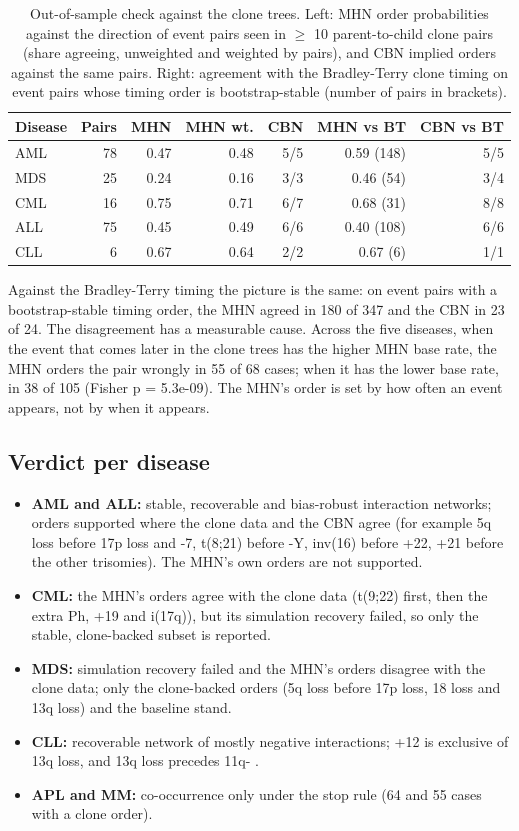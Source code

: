 \documentclass[conference]{IEEEtran}
\begin{document}
\begin{table}[!t]
\centering
\caption{Out-of-sample check against the clone trees. Left: MHN order probabilities against the direction of event pairs seen in $\geq$ 10 parent-to-child clone pairs (share agreeing, unweighted and weighted by pairs), and CBN implied orders against the same pairs. Right: agreement with the Bradley-Terry clone timing on event pairs whose timing order is bootstrap-stable (number of pairs in brackets).}
\label{tab:clone}
\footnotesize
\setlength{\tabcolsep}{3pt}
\begin{tabular}{lrrrrrr}
\toprule
\textbf{Disease} & \textbf{Pairs} & \textbf{MHN} & \textbf{MHN wt.} & \textbf{CBN} & \textbf{MHN vs BT} & \textbf{CBN vs BT} \\
\midrule
AML & 78 & 0.47 & 0.48 & 5/5 & 0.59 (148) & 5/5 \\
MDS & 25 & 0.24 & 0.16 & 3/3 & 0.46 (54) & 3/4 \\
CML & 16 & 0.75 & 0.71 & 6/7 & 0.68 (31) & 8/8 \\
ALL & 75 & 0.45 & 0.49 & 6/6 & 0.40 (108) & 6/6 \\
CLL & 6 & 0.67 & 0.64 & 2/2 & 0.67 (6) & 1/1 \\
\bottomrule
\end{tabular}
\end{table}
Against the Bradley-Terry timing the picture is the same: on event pairs with a bootstrap-stable timing order, the MHN agreed in 180 of 347 and the CBN in 23 of 24. The disagreement has a measurable cause. Across the five diseases, when the event that comes later in the clone trees has the higher MHN base rate, the MHN orders the pair wrongly in 55 of 68 cases; when it has the lower base rate, in 38 of 105 (Fisher p = 5.3e-09). The MHN's order is set by how often an event appears, not by when it appears.

\subsection{Verdict per disease}
\begin{itemize}
\item \textbf{AML and ALL:} stable, recoverable and bias-robust interaction networks; orders supported where the clone data and the CBN agree (for example 5q loss before 17p loss and -7, t(8;21) before -Y, inv(16) before +22, +21 before the other trisomies). The MHN's own orders are not supported.
\item \textbf{CML:} the MHN's orders agree with the clone data (t(9;22) first, then the extra Ph, +19 and i(17q)), but its simulation recovery failed, so only the stable, clone-backed subset is reported.
\item \textbf{MDS:} simulation recovery failed and the MHN's orders disagree with the clone data; only the clone-backed orders (5q loss before 17p loss, 18 loss and 13q loss) and the baseline stand.
\item \textbf{CLL:} recoverable network of mostly negative interactions; +12 is exclusive of 13q loss, and 13q loss precedes 11q- \cite{dohner2000}.
\item \textbf{APL and MM:} co-occurrence only under the stop rule (64 and 55 cases with a clone order).
\end{itemize}
\end{document}

